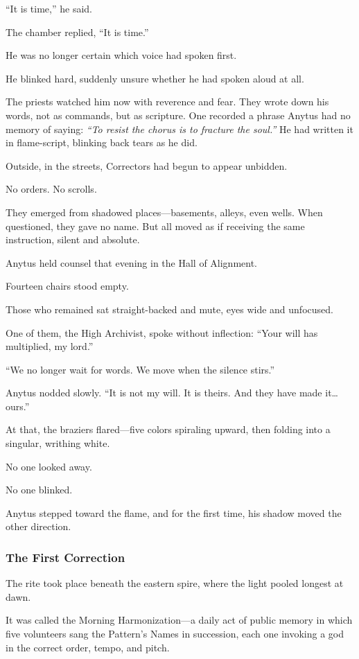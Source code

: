 \documentclass[12pt]{article}
\begin{document}
“It is time,” he said.

The chamber replied, “It is time.”

He was no longer certain which voice had spoken first.

He blinked hard, suddenly unsure whether he had spoken aloud at all.

The priests watched him now with reverence and fear. They wrote down his words, not as commands, but as scripture. One recorded a phrase Anytus had no memory of saying: \textit{“To resist the chorus is to fracture the soul.”} He had written it in flame-script, blinking back tears as he did.

Outside, in the streets, Correctors had begun to appear unbidden.

No orders. 
No scrolls. 

They emerged from shadowed places—basements, alleys, even wells. When questioned, they gave no name. But all moved as if receiving the same instruction, silent and absolute.

Anytus held counsel that evening in the Hall of Alignment. 

Fourteen chairs stood empty. 

Those who remained sat straight-backed and mute, eyes wide and unfocused. 

One of them, the High Archivist, spoke without inflection: “Your will has multiplied, my lord.”

“We no longer wait for words. We move when the silence stirs.”

Anytus nodded slowly. “It is not my will. It is theirs. And they have made it… ours.”

At that, the braziers flared—five colors spiraling upward, then folding into a singular, writhing white.

No one looked away. 

No one blinked.

Anytus stepped toward the flame, and for the first time, his shadow moved the other direction.

\dotfill

\subsubsection*{The First Correction}

The rite took place beneath the eastern spire, where the light pooled longest at dawn. 

It was called the Morning Harmonization—a daily act of public memory in which five volunteers sang the Pattern’s Names in succession, each one invoking a god in the correct order, tempo, and pitch.
\end{document}
